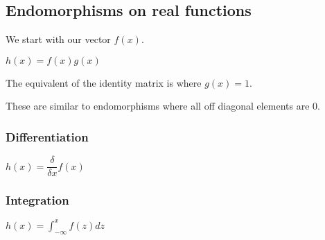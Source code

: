 
\subsection{Endomorphisms on real functions}

We start with our vector \(f(x)\).

\(h(x)=f(x)g(x)\)

The equivalent of the identity matrix is where \(g(x)=1\).

These are similar to endomorphisms where all off diagonal elements are \(0\).

\subsubsection{Differentiation}

\(h(x)=\dfrac{\delta }{\delta x}f(x)\)

\subsubsection{Integration}

\(h(x)=\int_{-\infty }^x f(z) dz\)


